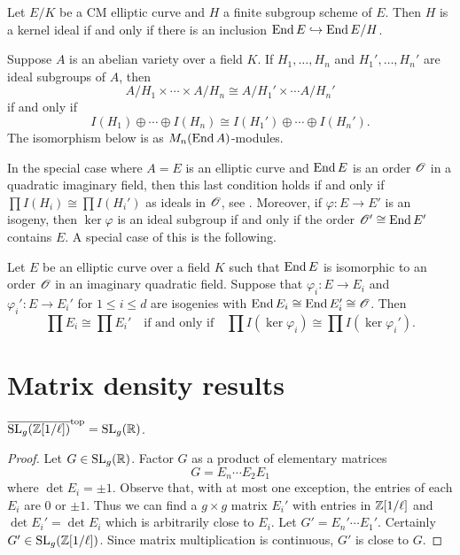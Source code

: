 \documentclass{amsart}
\begin{document}
\begin{theorem}
  Let $E/K$ be a CM elliptic curve and $H$ a finite subgroup scheme of $E$. Then $H$ is a kernel ideal if and only if there is an inclusion $\operatorname{End} E \hookrightarrow \operatorname{End} E/H$.
\end{theorem}

\begin{theorem}
  Suppose $A$ is an abelian variety over a field $K$. If $H_1,\dots,H_n$ and $H_1',\dots,H_n'$ are ideal subgroups of $A$, then
  \[
    A/H_1 \times \cdots \times A/H_n
    \cong
    A/H_1' \times \cdots A/H_n'
  \]
  if and only if
  \[
    I(H_1) \oplus \cdots \oplus I(H_n)
    \cong
    I(H_1') \oplus \cdots \oplus I(H_n').
  \]
  The isomorphism below is as $M_n(\operatorname{End} A)$-modules.
\end{theorem}

In the special case where $A = E$ is an elliptic curve and $\operatorname{End} E$ is an order $\mathscr{O}$ in a quadratic imaginary field, then this last condition holds if and only if $\prod I(H_i) \cong \prod I(H_i')$ as ideals in $\mathscr{O}$, see \cite[Rem.~49]{kani2011products}. Moreover, if $\varphi: E \to E'$ is an isogeny, then $\ker\varphi$ is an ideal subgroup if and only if the order $\mathscr{O}' \cong \operatorname{End} E'$ contains $E$. A special case of this is the following.

\begin{lemma}\label{lem:prod-idls}
  Let $E$ be an elliptic curve over a field $K$ such that $\operatorname{End} E$ is isomorphic to an order $\mathscr{O}$ in an imaginary quadratic field. Suppose that $\varphi_i: E \to E_i$ and $\varphi_i': E \to E_i'$ for $1 \leq i \leq d$ are isogenies with $\operatorname{End} E_i \cong \operatorname{End} E_i' \cong \mathscr{O}$. Then
  \[
    \prod E_i
    \cong
    \prod E_i'
    \quad\text{if and only if}\quad
    \prod I(\ker\varphi_i)
    \cong
    \prod I(\ker\varphi_i').
  \]
\end{lemma}

\section{Matrix density results}
\label{sec:matr-dens-results}

\begin{lemma}\label{lemma:sl-z-1overl-dense-sl-r}
  $\overline{\operatorname{SL}_g(\mathbb{Z}[1/\ell])}^\mathrm{top} = \operatorname{SL}_g(\mathbb{R})$.
\end{lemma}

\begin{proof}
  Let $G \in \operatorname{SL}_g(\mathbb{R})$. Factor $G$ as a product of elementary matrices
  \[
    G = E_n \cdots E_2 E_1
  \]
  where $\det E_i = \pm 1$. Observe that, with at most one exception, the entries of each $E_i$ are $0$ or $\pm 1$. Thus we can find a $g \times g$ matrix $E_i'$ with entries in $\mathbb{Z}[1/\ell]$ and $\det E_i' = \det E_i$ which is arbitrarily close to $E_i$. Let $G' = E_n' \cdots E_1'$. Certainly $G' \in \operatorname{SL}_g(\mathbb{Z}[1/\ell])$. Since matrix multiplication is continuous, $G'$ is close to $G$.
\end{proof}
\end{document}
